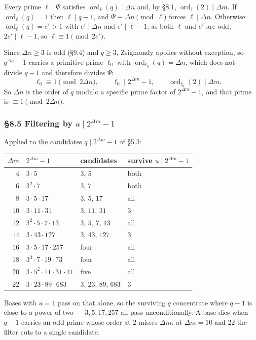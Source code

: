 \documentclass[11pt]{article}
\begin{document}
Every prime $\ell \mid \Psi$ satisfies $\operatorname{ord}_\ell(q) \mid \Delta n$ and, by \S8.1, $\operatorname{ord}_\ell(2) \mid \Delta m$. If $\operatorname{ord}_\ell(q) = 1$ then $\ell \mid q-1$, and $\Psi \equiv \Delta n \pmod \ell$ forces $\ell \mid \Delta n$. Otherwise $\operatorname{ord}_\ell(q) = e' > 1$ with $e' \mid \Delta n$ and $e' \mid \ell - 1$; as both $\ell$ and $e'$ are odd, $2e' \mid \ell-1$, so $\ell \equiv 1 \pmod{2e'}$.

Since $\Delta n \geq 3$ is odd (\S9.4) and $q \geq 3$, Zsigmondy applies without exception, so $q^{\Delta n}-1$ carries a primitive prime $\ell_0$ with $\operatorname{ord}_{\ell_0}(q) = \Delta n$, which does not divide $q-1$ and therefore divides $\Psi$:
\[
\ell_0 \equiv 1 \pmod{2\Delta n}, \qquad \ell_0 \mid 2^{\Delta m}-1, \qquad \operatorname{ord}_{\ell_0}(2) \mid \Delta m .
\]
So $\Delta n$ is the order of $q$ modulo a specific prime factor of $2^{\Delta m}-1$, and that prime is $\equiv 1 \pmod{2\Delta n}$.

\subsubsection*{\S8.5 Filtering by $u \mid 2^{\Delta m}-1$}

Applied to the candidates $q \mid 2^{\Delta m}-1$ of \S5.3:
\begin{center}
\begin{tabular}{rlll}
\hline
$\Delta m$ & $2^{\Delta m}-1$ & candidates & survive $u \mid 2^{\Delta m}-1$ \\
\hline
$4$ & $3\cdot 5$ & $3,\,5$ & both \\
$6$ & $3^2\cdot 7$ & $3,\,7$ & both \\
$8$ & $3\cdot 5\cdot 17$ & $3,\,5,\,17$ & all \\
$10$ & $3\cdot 11\cdot 31$ & $3,\,11,\,31$ & $3$ \\
$12$ & $3^2\cdot 5\cdot 7\cdot 13$ & $3,\,5,\,7,\,13$ & all \\
$14$ & $3\cdot 43\cdot 127$ & $3,\,43,\,127$ & $3$ \\
$16$ & $3\cdot 5\cdot 17\cdot 257$ & four & all \\
$18$ & $3^3\cdot 7\cdot 19\cdot 73$ & four & all \\
$20$ & $3\cdot 5^2\cdot 11\cdot 31\cdot 41$ & five & all \\
$22$ & $3\cdot 23\cdot 89\cdot 683$ & $3,\,23,\,89,\,683$ & $3$ \\
\hline
\end{tabular}
\end{center}
Bases with $u = 1$ pass on that alone, so the surviving $q$ concentrate where $q-1$ is close to a power of two --- $3, 5, 17, 257$ all pass unconditionally. A base dies when $q-1$ carries an odd prime whose order at $2$ misses $\Delta m$: at $\Delta m = 10$ and $22$ the filter cuts to a single candidate.
\end{document}
